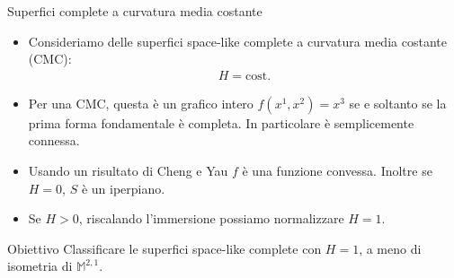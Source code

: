 \documentclass[aspectratio=169,11pt]{beamer}
\newcommand{\M}{\mathbb{M}^{2,1}}
\begin{document}
\begin{frame}{Superfici complete a curvatura media costante}
\begin{itemize}
	\setlength\itemsep{2mm}
	\item Consideriamo delle superfici space-like complete a curvatura
	media costante (CMC):
	\begin{align*}
		H=\text{cost}.
	\end{align*}
	\item Per una CMC, questa è un grafico intero $f(x^1,x^2) =x^3$ se e soltanto se la prima forma fondamentale è completa. In particolare è semplicemente connessa.
	\item Usando un risultato di Cheng e Yau $f$ è una funzione convessa. Inoltre se $H=0$, $S$ è un iperpiano.
	\item Se $H>0$, riscalando l'immersione possiamo normalizzare $H=1$.
\end{itemize}

\begin{block}{Obiettivo}
	Classificare le superfici space-like complete con $H=1$, a meno di
	isometria di $\M$.
\end{block}
\end{frame}
\end{document}

